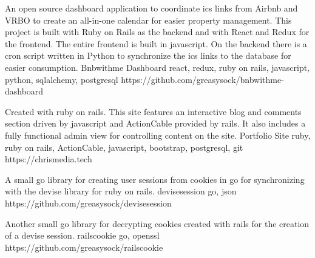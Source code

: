 \documentclass[]{awesome-cv}
\begin{document}
\vspace{-7mm}
\begin{cventries}
	\cventry
	{An open source dashboard application to coordinate ics links from Airbnb and VRBO to create an all-in-one calendar for easier property management. This project is built with Ruby on Rails as the backend and with React and Redux for the frontend. The entire frontend is built in javascript. On the backend there is a cron script written in Python to synchronize the ics links to the database for easier consumption.}
	{Bnbwithme Dashboard}
	{react, redux, ruby on rails, javascript, python, sqlalchemy, postgresql}
	{https://github.com/greasysock/bnbwithme-dashboard}
	{}
	
	\vspace{-5mm}
	\cventry
	{Created with ruby on rails. This site features an interactive blog and comments section driven by javascript and ActionCable provided by rails. It also includes a fully functional admin view for controlling content on the site.}
	{Portfolio Site}
	{ruby, ruby on rails, ActionCable, javascript, bootstrap, postgresql, git}
	{https://chrismedia.tech}
	{}
	
	\vspace{-5mm}
\end{cventries}

\vspace{3mm}
\begin{cventries}
	\cventry
	{A small go library for creating user sessions from cookies in go for synchronizing with the devise library for ruby on rails.}
	{devisesession}
	{go, json}
	{https://github.com/greasysock/devisesession}
	{}
	
	\vspace{-5mm}
	\cventry
	{Another small go library for decrypting cookies created with rails for the creation of a devise session.}
	{railscookie}
	{go, openssl}
	{https://github.com/greasysock/railscookie}
	{}
\end{cventries}

\ 
\end{document}
